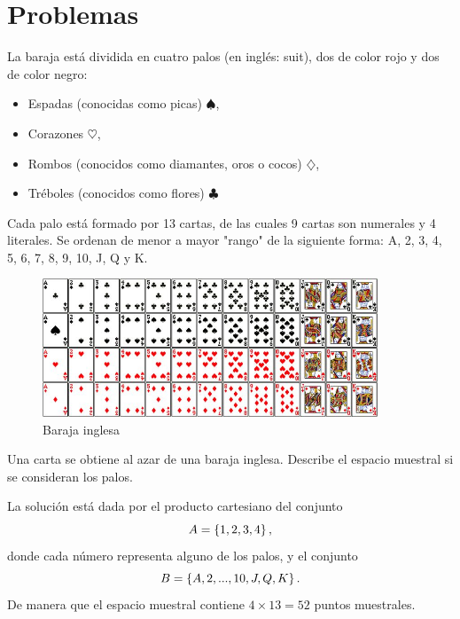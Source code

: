 
\section*{Problemas}

La baraja está dividida en cuatro palos (en inglés: suit), dos de color rojo y dos de color negro:
\begin{itemize}
	\item Espadas (conocidas como picas) $\spadesuit$,
	\item Corazones $\heartsuit$,
	\item Rombos (conocidos como diamantes, oros o cocos) $ \diamondsuit$,
	\item Tréboles (conocidos como flores) $\clubsuit$
\end{itemize}

Cada palo está formado por 13 cartas, de las cuales 9 cartas son numerales y 4 literales. Se ordenan de menor a mayor "rango" de la siguiente forma: A, 2, 3, 4, 5, 6, 7, 8, 9, 10, J, Q y K.

\begin{figure}
	\centering
	\includegraphics[width=10cm]{./pe/deck.jpg}
	\caption{Baraja inglesa}
	\label{fig:deck}
\end{figure}



\begin{problema}
	\label{problema:2.1}
	Una carta se obtiene al azar de una baraja inglesa. Describe el espacio muestral si se consideran los palos.
\end{problema}

\begin{solucion}\label{solucion:2.1}
	
	
	La solución está dada por el producto cartesiano del conjunto \[ A = \left\{ 1,2,3,4 \right\}, \] donde cada número representa alguno de los palos, y el conjunto \[ B = \left\{ A,2,...,10,J,Q,K \right\}.\] De manera que el espacio muestral contiene $ 4\times 13=52 $ puntos muestrales. 	
\end{solucion}


